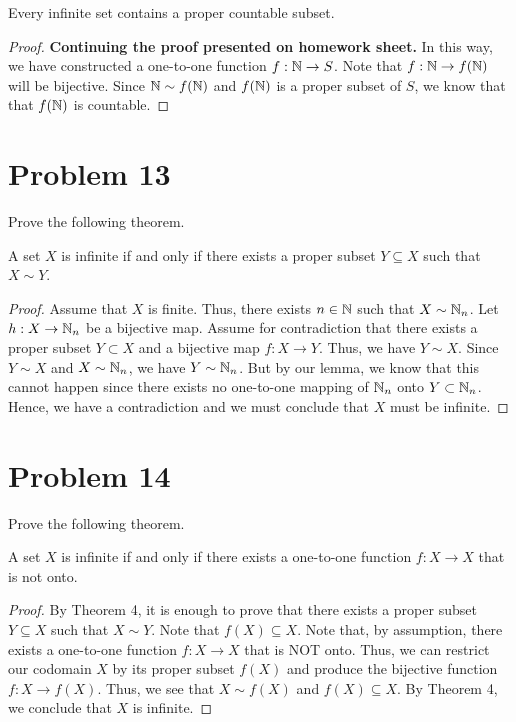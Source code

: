 \documentclass[11pt,a4paper]{article}
\begin{document}
\begin{theorem}[ ]
    Every infinite set contains a proper countable subset.
\end{theorem}
\begin{proof}
    \textbf{Continuing the proof presented on homework sheet.} In this way, we have constructed a one-to-one function \( f: \mathbb{N} \to S  \). Note that \( f: \mathbb{N} \to f(\mathbb{N}) \) will be bijective. Since \( \mathbb{N} \sim f(\mathbb{N}) \) and \( f(\mathbb{N})  \) is a proper subset of \( S  \), we know that that \( f(\mathbb{N}) \) is countable.
\end{proof}

\section*{Problem 13} Prove the following theorem.

\begin{theorem}[ ]
    A set \( X  \) is infinite if and only if there exists a proper subset \( Y \subseteq  X  \) such that \( X \sim Y  \).
\end{theorem}

\begin{proof}
Assume that \( X  \) is finite. Thus, there exists \( n \in \mathbb{N}  \) such that \( X \sim {\ensuremath{\mathbb{N}}}_{n} \). Let \( h: X \to {\ensuremath{\mathbb{N}}}_{n} \) be a bijective map. Assume for contradiction that there exists a proper subset \( Y \subset X  \) and a bijective map \( f: X \to Y  \). Thus, we have \( Y \sim X  \). Since \( Y \sim X  \) and \( X \sim {\ensuremath{\mathbb{N}}}_{n} \), we have \( Y \sim {\ensuremath{\mathbb{N}}}_{n} \). But by our lemma, we know that this cannot happen since there exists no one-to-one mapping of \( {\mathbb{N}}_{n} \) onto \( Y \subset {\ensuremath{\mathbb{N}}}_{n} \). Hence, we have a contradiction and we must conclude that \( X  \) must be infinite.
\end{proof}

\section*{Problem 14} Prove the following theorem.
\begin{theorem}[ ]
    A set \( X  \) is infinite if and only if there exists a one-to-one function \( f: X \to X  \) that is not onto.
\end{theorem}
\begin{proof}
By Theorem 4, it is enough to prove that there exists a proper subset \( Y \subseteq X   \) such that \(X \sim Y  \). Note that \( f(X) \subseteq  X   \). Note that, by assumption, there exists a one-to-one function \( f: X \to X  \) that is NOT onto. Thus, we can restrict our codomain \( X  \) by its proper subset \( f(X) \) and produce the bijective function    \( f: X \to f(X) \). Thus, we see that \( X \sim f(X) \) and \( f(X) \subseteq X  \). By Theorem 4, we conclude that \( X  \) is infinite.
\end{proof}
\end{document}
